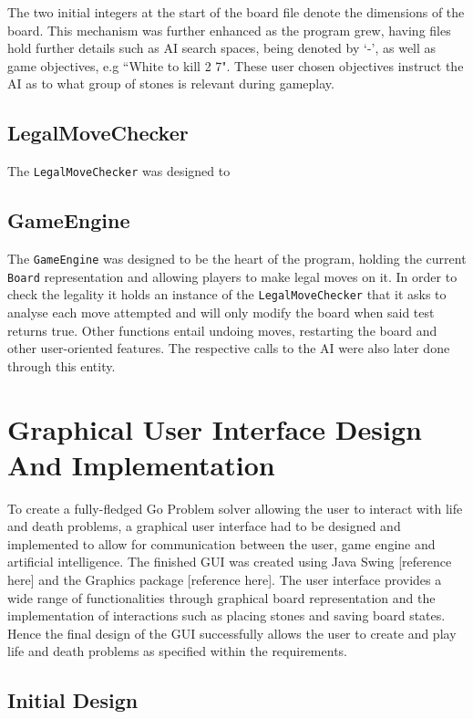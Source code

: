 \documentclass{l3proj}
\begin{document}
The two initial integers at the start of the board file denote the dimensions of the board. This mechanism was further enhanced as the program grew, having files hold further details such as AI search spaces, being denoted by `-', as well as game objectives, e.g ``White to kill 2 7". These user chosen objectives instruct the AI as to what group of stones is relevant during gameplay. 

\subsection{LegalMoveChecker}
The \texttt{LegalMoveChecker} was designed to 

\subsection{GameEngine}

The \texttt{GameEngine} was designed to be the heart of the program, holding the current \texttt{Board} representation and allowing players to make legal moves on it. In order to check the legality it holds an instance of the \texttt{LegalMoveChecker} that it asks to analyse each move attempted and will only modify the board when said test returns true. Other functions entail undoing moves, restarting the board and other user-oriented features. The respective calls to the AI were also later done through this entity.

\section{Graphical User Interface Design And Implementation}

To create a fully-fledged Go Problem solver allowing the user to interact with life and death problems, a graphical user interface had to be designed and implemented to allow for communication between the user, game engine and artificial intelligence. The finished GUI was created using Java Swing [reference here] and the Graphics package [reference here]. The user interface provides a wide range of functionalities through graphical board representation and the implementation of interactions such as placing stones and saving board states. Hence the final design of the GUI successfully allows the user to create and play life and death problems as specified within the requirements.

\subsection{Initial Design}
\end{document}

